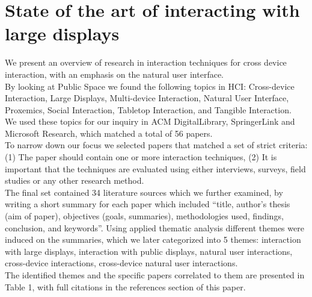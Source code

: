 \section{State of the art of interacting with large displays}
We present an overview of research in interaction techniques for cross device interaction, with an emphasis on the natural user interface.\\
By looking at Public Space we found the following topics in HCI: Cross-device Interaction, Large Displays, Multi-device Interaction, Natural User Interface, Proxemics, Social Interaction, Tabletop Interaction, and Tangible Interaction. \\
We used these topics for our inquiry in ACM DigitalLibrary, SpringerLink and Microsoft Research, which matched a total of 56 papers. \\
To narrow down our focus we selected papers that matched a set of strict criteria: (1) The paper should contain one or more interaction techniques, (2) It is important that the techniques are evaluated using either interviews, surveys, field studies or any other research method.\\
The final set contained 34 literature sources which we further examined, by writing a short summary for each paper which included ``title, author's thesis (aim of paper), objectives (goals, summaries), methodologies used, findings, conclusion, and keywords''. 
Using applied thematic analysis different themes were induced on the summaries, which we later categorized into 5 themes: interaction with large displays, interaction with public displays, natural user interactions, cross-device interactions, cross-device natural user interactions.\\
The identified themes and the specific papers correlated to them are presented in Table 1, with full citations in the references section of this paper. 


